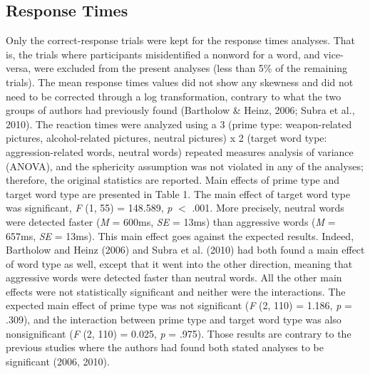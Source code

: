 \documentclass[authordate, serif, review]{jote-article}
\begin{document}
\begin{multicols}{2}
\subsection*{Response Times}
Only the correct-response trials were kept for the response times analyses. That is, the trials where participants misidentified a nonword for a word, and vice-versa, were excluded from the present analyses (less than 5\% of the remaining trials). The mean response times values did not show any skewness and did not need to be corrected through a log transformation, contrary to what the two groups of authors had previously found (Bartholow \& Heinz, 2006; Subra et al., 2010). The reaction times were analyzed using a 3 (prime type: weapon-related pictures, alcohol-related pictures, neutral pictures) x 2 (target word type: aggression-related words, neutral words) repeated measures analysis of variance (ANOVA), and the sphericity assumption was not violated in any of the analyses; therefore, the original statistics are reported. Main effects of prime type and target word type are presented in Table 1. The main effect of target word type was significant, \textit{F }(1, 55) = 148.589, \textit{p }$\mathrm{<}$ .001. More precisely, neutral words were detected faster (\textit{M }= 600ms, \textit{SE }= 13ms) than aggressive words (\textit{M }= 657ms, \textit{SE }= 13ms). This main effect goes against the expected results. Indeed, Bartholow and Heinz (2006) and Subra et al. (2010) had both found a main effect of word type as well, except that it went into the other direction, meaning that aggressive words were detected faster than neutral words. All the other main effects were not statistically significant and neither were the interactions. The expected main effect of prime type was not significant (\textit{F} (2, 110) = 1.186, \textit{p }= .309), and the interaction between prime type and target word type was also nonsignificant (\textit{F }(2, 110) = 0.025, \textit{p }= .975). Those results are contrary to the previous studies where the authors had found both stated analyses to be significant (2006, 2010). 

{}

\end{multicols}
\end{document}
